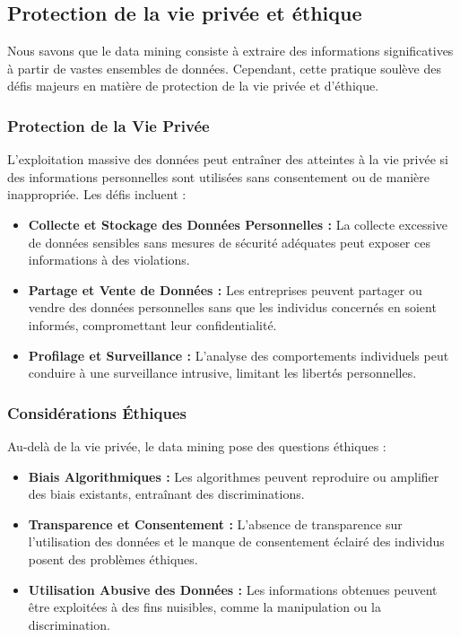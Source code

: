 \documentclass[a4paper,14pt]{article}
\begin{document}
	\subsection{Protection de la vie privée et éthique}
		Nous savons que le data mining consiste à extraire des informations significatives à partir de vastes ensembles de données. Cependant, cette pratique soulève des défis majeurs en matière de protection de la vie privée et d'éthique.

		\subsubsection{Protection de la Vie Privée}
		L'exploitation massive des données peut entraîner des atteintes à la vie privée si des informations personnelles sont utilisées sans consentement ou de manière inappropriée. Les défis incluent :
			\begin{itemize}
				\item \textbf{Collecte et Stockage des Données Personnelles :} La collecte excessive de données sensibles sans mesures de sécurité adéquates peut exposer ces informations à des violations.
				\item \textbf{Partage et Vente de Données :} Les entreprises peuvent partager ou vendre des données personnelles sans que les individus concernés en soient informés, compromettant leur confidentialité.
				\item \textbf{Profilage et Surveillance :} L'analyse des comportements individuels peut conduire à une surveillance intrusive, limitant les libertés personnelles.
			\end{itemize}

		\subsubsection{Considérations Éthiques}
		Au-delà de la vie privée, le data mining pose des questions éthiques :
			\begin{itemize}
				\item \textbf{Biais Algorithmiques :} Les algorithmes peuvent reproduire ou amplifier des biais existants, entraînant des discriminations.
				\item \textbf{Transparence et Consentement :} L'absence de transparence sur l'utilisation des données et le manque de consentement éclairé des individus posent des problèmes éthiques.
				\item \textbf{Utilisation Abusive des Données :} Les informations obtenues peuvent être exploitées à des fins nuisibles, comme la manipulation ou la discrimination.
			\end{itemize}
			
\end{document}
